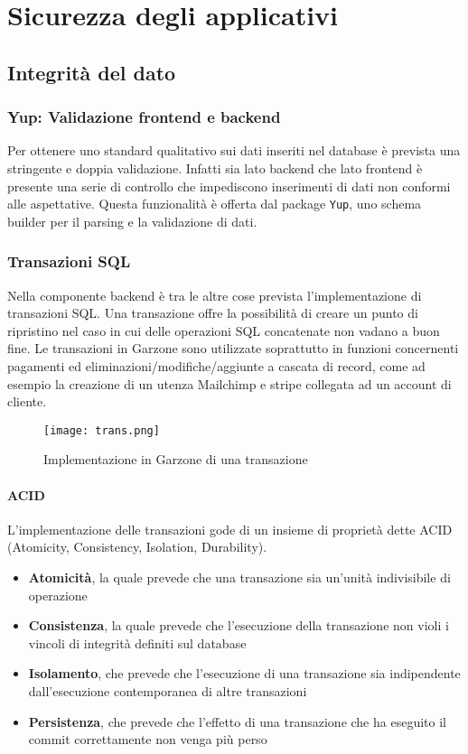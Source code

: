 \chapter{Sicurezza degli applicativi}
\section{Integrità del dato}
\subsection{Yup: Validazione frontend e backend}
Per ottenere uno standard qualitativo sui dati inseriti nel database è prevista una stringente e doppia validazione. Infatti sia lato backend che lato frontend è presente una serie di controllo che impediscono inserimenti di dati non conformi alle aspettative. Questa funzionalità è offerta dal package \lstinline[basicstyle=\ttfamily]!Yup!, uno schema builder per il parsing e la validazione di dati.
\subsection{Transazioni SQL}
Nella componente backend è tra le altre cose prevista l'implementazione di transazioni SQL. Una transazione offre la possibilità di creare un punto di ripristino nel caso in cui delle operazioni SQL concatenate non vadano a buon fine. Le transazioni in Garzone sono utilizzate soprattutto in funzioni concernenti pagamenti ed eliminazioni/modifiche/aggiunte a cascata di record, come ad esempio la creazione di un utenza Mailchimp e stripe collegata ad un account di cliente.
\begin{figure}[h!]
    \centering
    \texttt{[image: trans.png]}
    \caption{Implementazione in Garzone di una transazione}
\end{figure}
\newpage
\subsubsection{ACID} L'implementazione delle transazioni gode di un insieme di proprietà dette ACID (Atomicity, Consistency, Isolation, Durability)\cite{ACID}. 
\begin{itemize}
    \item \textbf{Atomicità}, la quale prevede che una transazione sia un'unità indivisibile di operazione
    \item \textbf{Consistenza}, la quale prevede che l'esecuzione della  transazione non violi i vincoli di integrità definiti sul database
    \item \textbf{Isolamento}, che prevede che l'esecuzione di una  transazione sia indipendente dall'esecuzione contemporanea di altre  transazioni
    \item \textbf{Persistenza}, che prevede che l'effetto di una transazione che ha eseguito il commit correttamente non venga più perso
\end{itemize}
